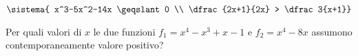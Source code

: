 \begin{esercizio}[*]
\begin{enumeratea}
\item \(\sistema{
   x^3-5x^2-14x \geqslant 0 \\ 
   \dfrac{2x+1}{2x} > \dfrac 3{x+1}}\)
\end{enumeratea}
\end{esercizio}


\begin{esercizio}[*]
\label{ese:4.83}
Per quali valori di \( x \) le due funzioni \(f_1=x^4-x^3+x-1\) e 
\(f_2=x^4-8x\) 
assumono contemporaneamente valore positivo? 
\end{esercizio}
